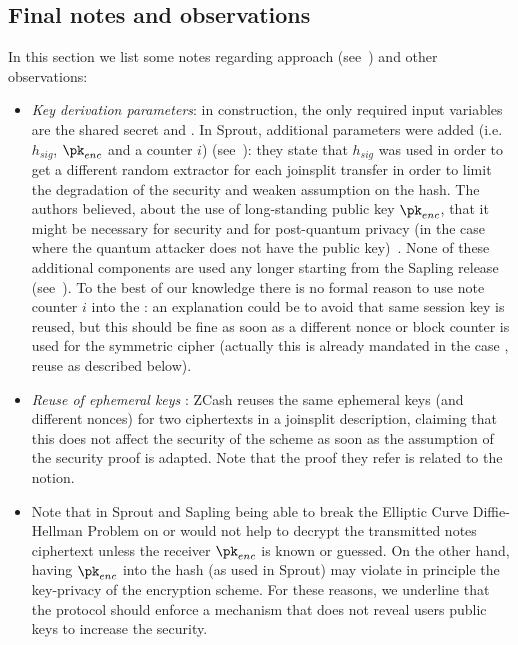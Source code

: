 \subsection{Final notes and observations}\label{instantiation:enc:final-notes}

In this section we list some notes regarding \zcash{} approach (see~\cite[Section 8.7]{zcashprotocol}) and other observations:
\begin{itemize}
    \item \emph{Key derivation parameters}: in \dhaes{} construction, the only required input variables are the shared secret \sharedSecret{} and \epk. In Sprout, additional parameters were added (i.e. $h_{sig}$, $\pk_{enc}$ and a counter $i$) (see~\cite[5.4.4.2]{zcashprotocol}): they state that $h_{sig}$ was used in order to get a different random extractor for each joinsplit transfer in order to limit the degradation of the security and weaken assumption on the hash. The authors believed, about the use of long-standing public key $\pk_{enc}$, that it might be necessary for \indccaii{} security and for post-quantum privacy (in the case where the quantum attacker does not have the public key)~\cite{zcashforum2019encsec}. None of these additional components are used any longer starting from the Sapling release (see~\cite[5.4.4.4]{zcashprotocol}). To the best of our knowledge there is no formal reason to use note counter $i$ into the \kdf{}: an explanation could be to avoid that same session key is reused, but this should be fine as soon as a different nonce or block counter is used for the symmetric cipher (actually this is already mandated in the case \epk{}, reuse as described below).
    \item \emph{Reuse of ephemeral keys} \epk: ZCash reuses the same ephemeral keys \epk{} (and different nonces) for two ciphertexts in a joinsplit description, claiming that this does not affect the security of the scheme as soon as the \hdhi{} assumption of the \dhaes{} security proof is adapted. Note that the proof they refer is related to the \indccaii{} notion.
    \item Note that in \zcash{} Sprout and Sapling being able to break the Elliptic Curve Diffie-Hellman Problem on  or \jubjub{} would not help to decrypt the transmitted notes ciphertext unless the receiver $\pk_{enc}$ is known or guessed. On the other hand, having $\pk_{enc}$ into the hash (as used in Sprout) may violate in principle the key-privacy of the encryption scheme. For these reasons, we underline that the protocol should enforce a mechanism that does not reveal users public keys to increase the security.

\end{itemize}
